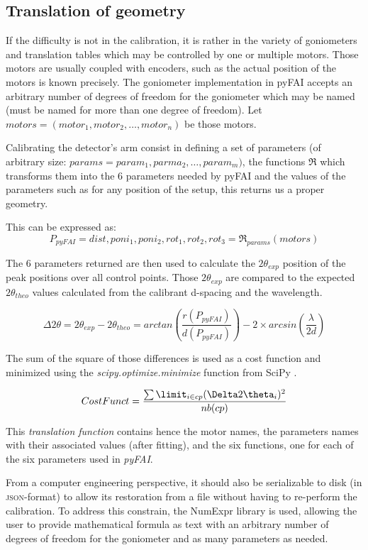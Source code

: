 \documentclass[preprint, pdf]{iucr}              %
\begin{document}
\subsection{Translation of geometry}

If the difficulty is not in the calibration, it is  rather in the variety of
goniometers and translation tables which may be controlled by one or multiple
motors.
Those motors are usually coupled with encoders, such as the actual position of
the motors is known precisely.
The goniometer implementation in pyFAI accepts an
arbitrary number of degrees of freedom for the goniometer which may be named 
(must be named for more than one degree of freedom). 
Let $motors = (motor_1, motor_2, \ldots, motor_n)$ be those motors. 

Calibrating the detector's arm consist in defining a set of parameters
(of arbitrary size: $params = param_1, parma_2, \ldots, param_m)$, the
functions $\Re$ which transforms them into the 6 parameters needed by pyFAI and 
the values of the parameters such as for any position of the setup, this returns
us a proper geometry.

This can be expressed as:
$$
P_{pyFAI} = dist, poni_1, poni_2, rot_1, rot_2, rot_3 = \Re_{params}(motors)
$$

The 6 parameters returned 
are then used to
calculate the $2\theta_{exp}$ position of the peak positions over all control
points.
Those $2\theta_{exp}$ are compared to
the expected $2\theta_{theo}$ values calculated from the calibrant d-spacing and
the wavelength.

$$
\Delta 2\theta = 2\theta _{exp} - 2\theta _{theo} =
arctan(\frac{r(P_{pyFAI})}{d(P_{pyFAI})}) -  2 \times
arcsin(\frac{\lambda}{2d})
$$


The sum of the square of those differences is used as a cost function and
minimized using the \textit{scipy.optimize.minimize} function from SciPy \cite{scipy}.

$$
CostFunct = \frac{ \sum\limit_{i \in cp} {(\Delta 2\theta_i)^2}} {nb(cp)} 
$$


This \textit{translation function} contains hence the motor names, the
parameters names with their associated values (after fitting), and the six
functions, one for each of the six parameters used in \textit{pyFAI}.

From a computer engineering perspective, it should also be serializable to 
disk (in \textsc{json}-format) to allow its restoration from a file without
having to re-perform the calibration. 
To address this constrain, the NumExpr library \cite{numexpr} is
used, allowing the user to provide mathematical formula as text with an
arbitrary number of degrees of freedom for the goniometer and as many parameters
as needed.
\end{document}
